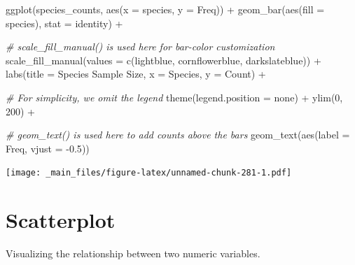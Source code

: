 \documentclass[
]{book}
\newenvironment{Shaded}{\begin{snugshade}}{\end{snugshade}}
\newcommand{\AttributeTok}[1]{\textcolor[rgb]{0.77,0.63,0.00}{#1}}
\newcommand{\CommentTok}[1]{\textcolor[rgb]{0.56,0.35,0.01}{\textit{#1}}}
\newcommand{\DecValTok}[1]{\textcolor[rgb]{0.00,0.00,0.81}{#1}}
\newcommand{\FloatTok}[1]{\textcolor[rgb]{0.00,0.00,0.81}{#1}}
\newcommand{\FunctionTok}[1]{\textcolor[rgb]{0.00,0.00,0.00}{#1}}
\newcommand{\NormalTok}[1]{#1}
\newcommand{\SpecialCharTok}[1]{\textcolor[rgb]{0.00,0.00,0.00}{#1}}
\newcommand{\StringTok}[1]{\textcolor[rgb]{0.31,0.60,0.02}{#1}}
\begin{document}
\begin{Shaded}
\begin{Highlighting}[]
\FunctionTok{ggplot}\NormalTok{(species\_counts, }\FunctionTok{aes}\NormalTok{(}\AttributeTok{x =}\NormalTok{ species, }\AttributeTok{y =}\NormalTok{ Freq)) }\SpecialCharTok{+}
  \FunctionTok{geom\_bar}\NormalTok{(}\FunctionTok{aes}\NormalTok{(}\AttributeTok{fill =}\NormalTok{ species), }\AttributeTok{stat =} \StringTok{\textquotesingle{}identity\textquotesingle{}}\NormalTok{) }\SpecialCharTok{+}
  
  \CommentTok{\# scale\_fill\_manual() is used here for bar{-}color customization}
  \FunctionTok{scale\_fill\_manual}\NormalTok{(}\AttributeTok{values =} \FunctionTok{c}\NormalTok{(}\StringTok{\textquotesingle{}lightblue\textquotesingle{}}\NormalTok{, }\StringTok{\textquotesingle{}cornflowerblue\textquotesingle{}}\NormalTok{, }\StringTok{\textquotesingle{}darkslateblue\textquotesingle{}}\NormalTok{)) }\SpecialCharTok{+} 
  \FunctionTok{labs}\NormalTok{(}\AttributeTok{title =} \StringTok{\textquotesingle{}Species Sample Size\textquotesingle{}}\NormalTok{, }\AttributeTok{x =} \StringTok{\textquotesingle{}Species\textquotesingle{}}\NormalTok{, }\AttributeTok{y =} \StringTok{\textquotesingle{}Count\textquotesingle{}}\NormalTok{) }\SpecialCharTok{+}
  
  \CommentTok{\# For simplicity, we omit the legend }
  \FunctionTok{theme}\NormalTok{(}\AttributeTok{legend.position =} \StringTok{\textquotesingle{}none\textquotesingle{}}\NormalTok{) }\SpecialCharTok{+} 
  \FunctionTok{ylim}\NormalTok{(}\DecValTok{0}\NormalTok{, }\DecValTok{200}\NormalTok{) }\SpecialCharTok{+} 
  
  \CommentTok{\# geom\_text() is used here to add counts above the bars}
  \FunctionTok{geom\_text}\NormalTok{(}\FunctionTok{aes}\NormalTok{(}\AttributeTok{label =}\NormalTok{ Freq, }\AttributeTok{vjust =} \SpecialCharTok{{-}}\FloatTok{0.5}\NormalTok{)) }
\end{Highlighting}
\end{Shaded}

\texttt{[image: \_main\_files/figure-latex/unnamed-chunk-281-1.pdf]}

\hypertarget{scatterplot}{%
\section{Scatterplot}\label{scatterplot}}

Visualizing the relationship between two numeric variables.
\end{document}
